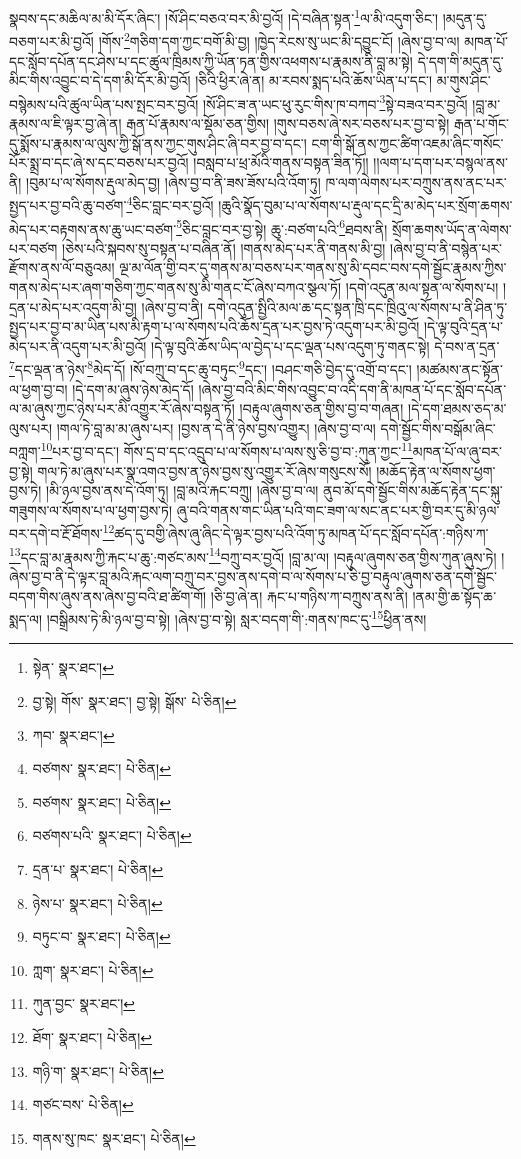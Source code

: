 སྣབས་དང་མཆིལ་མ་མི་དོར་ཞིང་། །སོ་ཤིང་བཅའ་བར་མི་བྱའོ། །དེ་བཞིན་སྟན་\footnote{སྟེན་  སྣར་ཐང་། }ལ་མི་འདུག་ཅིང་། །མདུན་དུ་བཅག་པར་མི་བྱའོ། །གོས་\footnote{བྱ་སྟེ། གོས་  སྣར་ཐང་། བྱ་སྟེ། སྒོས་  པེ་ཅིན། }གཅིག་དག་ཀྱང་བགོ་མི་བྱ། །ཁྱེད་རེངས་སུ་ཡང་མི་དབྱུང་ངོ། །ཞེས་བྱ་བ་ལ། མཁན་པོ་དང་སློབ་དཔོན་དང་ཤེས་པ་དང་ཚུལ་ཁྲིམས་ཀྱི་ཡོན་ཏན་གྱིས་འཕགས་པ་རྣམས་ནི་བླ་མ་སྟེ། དེ་དག་གི་མདུན་དུ་མིང་གིས་འབྱུང་བ་དེ་དག་མི་དོར་མི་བྱའོ། །ཅིའི་ཕྱིར་ཞེ་ན། མ་རབས་སྨད་པའི་ཆོས་ཡིན་པ་དང་། མ་གུས་ཤིང་བསྙེམས་པའི་ཚུལ་ཡིན་པས་སྤང་བར་བྱའོ། །སོ་ཤིང་ཟ་ན་ཡང་ཕུ་རུང་གིས་ཁ་བཀབ་\footnote{ཀབ་  སྣར་ཐང་། }སྟེ་བཟའ་བར་བྱའོ། །བླ་མ་རྣམས་ལ་ཇི་ལྟར་བྱ་ཞེ་ན། རྒན་པོ་རྣམས་ལ་སྡོམ་ཅན་གྱིས། །གུས་བཅས་ཞེ་སར་བཅས་པར་བྱ་བ་སྟེ། རྒན་པ་གོང་དུ་སྨོས་པ་རྣམས་ལ་ལུས་ཀྱི་སྒོ་ནས་ཀྱང་གུས་ཤིང་ཞི་བར་བྱ་བ་དང་། ངག་གི་སྒོ་ནས་ཀྱང་ཚིག་འཇམ་ཞིང་གསོང་པོར་སྨྲ་བ་དང་ཞེ་ས་དང་བཅས་པར་བྱའོ། །བསླབ་པ་ཕྲ་མོའི་གནས་བསྟན་ཟིན་ཏོ།། །།ལག་པ་དག་པར་བསྙལ་ནས་ནི། །བུམ་པ་ལ་སོགས་རྡུལ་མེད་བྱ། །ཞེས་བྱ་བ་ནི་ཟས་ཟོས་པའི་འོག་ཏུ། ཁ་ལག་ལེགས་པར་བཀྲུས་ནས་ནང་པར་སྤྱད་པར་བྱ་བའི་ཆུ་བཙག་\footnote{བཙགས་  སྣར་ཐང་།  པེ་ཅིན། }ཅིང་བླང་བར་བྱའོ། །ཆུའི་སྣོད་བུམ་པ་ལ་སོགས་པ་རྡུལ་དང་དྲི་མ་མེད་པར་སྲོག་ཆགས་མེད་པར་བརྟགས་ནས་ཆུ་ཡང་བཙག་\footnote{བཙགས་  སྣར་ཐང་།  པེ་ཅིན། }ཅིང་བླང་བར་བྱ་སྟེ། ཆུ་:བཙག་པའི་\footnote{བཙགས་པའི་  སྣར་ཐང་།  པེ་ཅིན། }ཐབས་ནི། སྲོག་ཆགས་ཡོད་ན་ལེགས་པར་བཙག །ཅེས་པའི་སྐབས་སུ་བསྟན་པ་བཞིན་ནོ། །གནས་མེད་པར་ནི་གནས་མི་བྱ། །ཞེས་བྱ་བ་ནི་བསྙེན་པར་རྫོགས་ནས་ལོ་བཅུའམ། ལྔ་མ་ལོན་གྱི་བར་དུ་གནས་མ་བཅས་པར་གནས་སུ་མི་དབང་བས་དགེ་སྦྱོང་རྣམས་ཀྱིས་གནས་མེད་པར་ཞག་གཅིག་ཀྱང་གནས་སུ་མི་གནང་ངོ་ཞེས་བཀའ་སྩལ་ཏོ། །དགེ་འདུན་མལ་སྟན་ལ་སོགས་པ། །དྲན་པ་མེད་པར་འདུག་མི་བྱ། །ཞེས་བྱ་བ་ནི། དགེ་འདུན་སྤྱིའི་མལ་ཆ་དང་སྟན་ཁྲི་དང་ཁྲིའུ་ལ་སོགས་པ་ནི་ཤིན་ཏུ་སྤྱད་པར་བྱ་བ་མ་ཡིན་པས་མི་རྟག་པ་ལ་སོགས་པའི་ཆོས་དྲན་པར་བྱས་ཏེ་འདུག་པར་མི་བྱའོ། །དེ་ལྟ་བུའི་དྲན་པ་མེད་པར་ནི་འདུག་པར་མི་བྱའོ། །དེ་ལྟ་བུའི་ཆོས་ཡིད་ལ་བྱེད་པ་དང་ལྡན་པས་འདུག་ཏུ་གནང་སྟེ། དེ་བས་ན་དྲན་\footnote{དྲན་པ་  སྣར་ཐང་།  པེ་ཅིན། }དང་ལྡན་ན་ཉེས་\footnote{ཉེས་པ་  སྣར་ཐང་།  པེ་ཅིན། }མེད་དོ། །སོ་བཀྲུ་བ་དང་ཆུ་བཏུང་\footnote{བཏུང་བ་  སྣར་ཐང་།  པེ་ཅིན། }དང་། །བཤང་གཅི་བྱེད་དུ་འགྲོ་བ་དང་། །མཚམས་ནང་སྟོན་ལ་ཕྱག་བྱ་བ། །དེ་དག་མ་ཞུས་ཉེས་མེད་དོ། །ཞེས་བྱ་བའི་མིང་གིས་འབྱུང་བ་འདི་དག་ནི་མཁན་པོ་དང་སློབ་དཔོན་ལ་མ་ཞུས་ཀྱང་ཉེས་པར་མི་འགྱུར་རོ་ཞེས་བསྟན་ཏོ། །བརྟུལ་ཞུགས་ཅན་གྱིས་བྱ་བ་གཞན། །དེ་དག་ཐམས་ཅད་མ་ལུས་པར། །གལ་ཏེ་བླ་མ་མ་ཞུས་པར། །བྱས་ན་དེ་ནི་ཉེས་བྱས་འགྱུར། །ཞེས་བྱ་བ་ལ། དགེ་སྦྱོང་གིས་བསྒོམ་ཞིང་བཀླག་\footnote{ཀླག་  སྣར་ཐང་།  པེ་ཅིན། }པར་བྱ་བ་དང་། གོས་དྲ་བ་དང་འདྲུབ་པ་ལ་སོགས་པ་ལས་སུ་ཅི་བྱ་བ་:ཀུན་ཀྱང་\footnote{ཀུན་བྱང་  སྣར་ཐང་། }མཁན་པོ་ལ་ཞུ་བར་བྱ་སྟེ། གལ་ཏེ་མ་ཞུས་པར་སྣ་འགའ་བྱས་ན་ཉེས་བྱས་སུ་འགྱུར་རོ་ཞེས་གསུངས་སོ། །མཆོད་རྟེན་ལ་སོགས་ཕྱག་བྱས་ཏེ། །མི་ཉལ་བྱས་ནས་དེ་འོག་ཏུ། །བླ་མའི་རྐང་བཀྲུ། །ཞེས་བྱ་བ་ལ། ནུབ་མོ་དགེ་སྦྱོང་གིས་མཆོད་རྟེན་དང་སྐུ་གཟུགས་ལ་སོགས་པ་ལ་ཕྱག་བྱས་ཏེ། ཞུ་བའི་གནས་གང་ཡིན་པའི་གང་ཟག་ལ་སང་ནང་པར་གྱི་བར་དུ་མི་ཉལ་བར་དགེ་བ་རྔོ་ཐོགས་\footnote{ཐོག་  སྣར་ཐང་།  པེ་ཅིན། }ཚད་དུ་བགྱི་ཞེས་ཞུ་ཞིང་དེ་ལྟར་བྱས་པའི་འོག་ཏུ་མཁན་པོ་དང་སློབ་དཔོན་:གཉིས་ཀ་\footnote{གཉི་ག་  སྣར་ཐང་།  པེ་ཅིན། }དང་བླ་མ་རྣམས་ཀྱི་རྐང་པ་ཆུ་:གཙང་མས་\footnote{གཙང་བས་  པེ་ཅིན། }བཀྲུ་བར་བྱའོ། །བླ་མ་ལ། །བརྟུལ་ཞུགས་ཅན་གྱིས་ཀུན་ཞུས་ཏེ། །ཞེས་བྱ་བ་ནི་དེ་ལྟར་བླ་མའི་རྐང་ལག་བཀྲུ་བར་བྱས་ནས་དགེ་བ་ལ་སོགས་པ་ཅི་བྱ་བརྟུལ་ཞུགས་ཅན་དགེ་སྦྱོང་བདག་གིས་ཞུས་ནས་ཞེས་བྱ་བའི་ཐ་ཚིག་གོ། །ཅི་བྱ་ཞེ་ན། རྐང་པ་གཉིས་ཀ་བཀྲུས་ནས་ནི། །ནམ་གྱི་ཆ་སྟོད་ཆ་སྨད་ལ། །བསྒྲིམས་ཏེ་མི་ཉལ་བྱ་བ་སྟེ། །ཞེས་བྱ་བ་སྟེ། སླར་བདག་གི་:གནས་ཁང་དུ་\footnote{གནས་སུ་ཁང་  སྣར་ཐང་།  པེ་ཅིན། }ཕྱིན་ནས། 